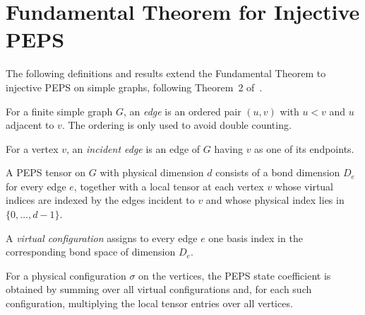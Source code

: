 
\chapter{Fundamental Theorem for Injective PEPS}%
\label{ch:peps_ft}
\label{sec:peps_ft}

The following definitions and results extend the Fundamental Theorem to
injective PEPS on simple graphs, following
Theorem~2 of~\cite{Molnar2018NormalPEPS}.

\begin{definition}
    \label{def:peps_edge}
    \leanok
    For a finite simple graph $G$, an \emph{edge} is an ordered pair
    $(u,v)$ with $u < v$ and $u$ adjacent to $v$.
    The ordering is only used to avoid double counting.
\end{definition}

\begin{definition}
    \label{def:peps_incident_edge}
    \leanok
    For a vertex $v$, an \emph{incident edge} is an edge of $G$ having $v$
    as one of its endpoints.
\end{definition}

\begin{definition}
    \label{def:peps_tensor}
    \leanok
    A PEPS tensor on $G$ with physical dimension $d$ consists of a bond
    dimension $D_e$ for every edge $e$, together with a local tensor at each
    vertex $v$ whose virtual indices are indexed by the edges incident to $v$
    and whose physical index lies in $\{0,\ldots,d-1\}$.
\end{definition}

\begin{definition}
    \label{def:peps_virtual_config}
    \leanok
    A \emph{virtual configuration} assigns to every edge $e$ one basis index in
    the corresponding bond space of dimension $D_e$.
\end{definition}

\begin{definition}
    \label{def:peps_stateCoeff}
    \leanok
    For a physical configuration $\sigma$ on the vertices, the PEPS state
    coefficient is obtained by summing over all virtual configurations and,
    for each such configuration, multiplying the local tensor entries over all
    vertices.
\end{definition}

